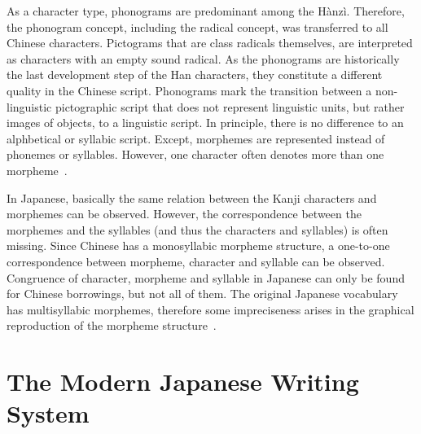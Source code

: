As a character type, phonograms are predominant among the Hànzì. Therefore, the
phonogram concept, including the radical concept, was transferred to all Chinese 
characters. Pictograms that are class radicals themselves, are interpreted as 
characters with an empty sound radical. As the phonograms are historically the 
last development step of the Han characters, they constitute a different quality 
in the Chinese script. Phonograms mark the transition between a non-linguistic
pictographic script that does not represent linguistic units, but rather images 
of objects, to a linguistic script. In principle, there is no difference to
an alphbetical or syllabic script. Except, morphemes are represented instead of 
phonemes or syllables. However, one character often denotes more than one 
morpheme~.

In Japanese, basically the same relation between the Kanji characters and 
morphemes can be observed. However, the correspondence between the morphemes and 
the syllables (and thus the characters and syllables) is often missing.
Since Chinese has a monosyllabic morpheme structure, a one-to-one correspondence
between morpheme, character and syllable can be observed.
Congruence of character, morpheme and syllable in Japanese can only be found for
Chinese borrowings, but not all of them. The original Japanese vocabulary has
multisyllabic morphemes, therefore some impreciseness arises in the graphical
reproduction of the morpheme structure~.


\section{The Modern Japanese Writing System}
\label{sec:modernjapanesewritingsystem}


